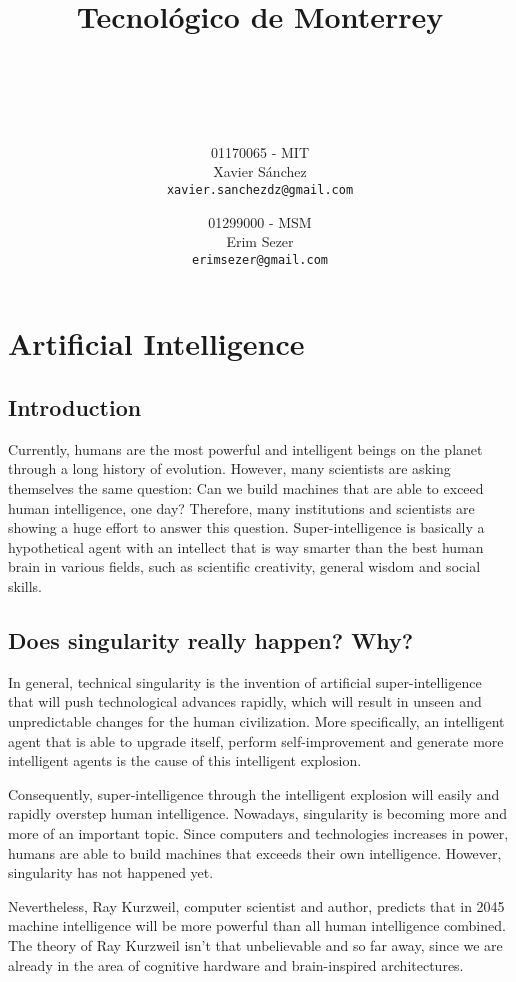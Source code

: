 \documentclass[titlepage, letterpaper, fleqn]{article}
\title{
  \vspace{1in}
  \textbf{Tecnológico de Monterrey} \\
  \vspace{0.5in}
  \textmd{\mahclass} \\
  \large{\textit{\mahteacher}} \\
  \vspace{0.5in}
  \textsc{\mahtitle}
  \author{01170065 - MIT \\
  Xavier Sánchez \\
  \texttt{xavier.sanchezdz@gmail.com}
  \and
  01299000 - MSM \\
  Erim Sezer \\
  \texttt{erimsezer@gmail.com}
  }
  \date{\mahdate}
}
\begin{document}
\begin{titlepage}
\maketitle
\end{titlepage}

%
%

\section{Artificial Intelligence}
\subsection{Introduction}

Currently, humans are the most powerful and intelligent beings on the planet through a long history of evolution.
However, many scientists are asking themselves the same question: Can we build machines that are able to exceed human intelligence, one day?
Therefore, many institutions and scientists are showing a huge effort to answer this question.
Super-intelligence is basically a hypothetical agent with an intellect that is way smarter than the best human brain in various fields, such as scientific creativity, general wisdom and social skills.

\subsection{Does singularity really happen? Why?}
In general, technical singularity is the invention of artificial super-intelligence that will push technological advances rapidly, which will result in unseen and unpredictable changes for the human civilization.
More specifically, an intelligent agent that is able to upgrade itself, perform self-improvement and generate more intelligent agents is the cause of this intelligent explosion.

Consequently, super-intelligence through the intelligent explosion will easily and rapidly overstep human intelligence.
Nowadays, singularity is becoming more and more of an important topic. Since computers and technologies increases in power, humans are able to build machines that exceeds their own intelligence.
However, singularity has not happened yet.

Nevertheless, Ray Kurzweil, computer scientist and author, predicts that in 2045 machine intelligence will be more powerful than all human intelligence combined.
The theory of Ray Kurzweil isn't that unbelievable and so far away, since we are already in the area of cognitive hardware and brain-inspired architectures.
\end{document}
